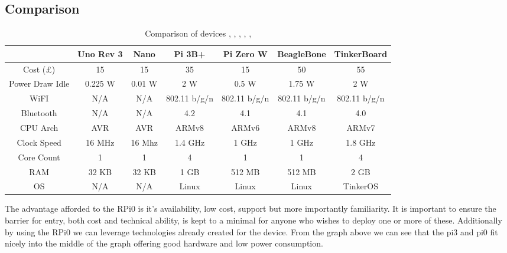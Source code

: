 \subsection{Comparison}
\begin{table}[H]
	\hspace{-2cm}
	\begin{tabular}{ccccccc}
		\hline 
		{} & Uno Rev 3 & Nano & Pi 3B+ & Pi Zero W & BeagleBone & TinkerBoard \\ 
		\hline 
		Cost (£) & 15 & 15 & 35 & 15 & 50 & 55 \\ 
		Power Draw Idle & 0.225 W & 0.01 W & 2 W & 0.5 W & 1.75 W & 2 W  \\ 
		WiFI & N/A & N/A & 802.11 b/g/n & 802.11 b/g/n & 802.11 b/g/n & 802.11 b/g/n \\ 
		Bluetooth & N/A & N/A & 4.2 & 4.1 & 4.1 & 4.0 \\ 
		CPU Arch & AVR & AVR & ARMv8 & ARMv6 & ARMv8 & ARMv7 \\ 
		Clock Speed & 16 MHz & 16 Mhz & 1.4 GHz & 1 GHz & 1 GHz & 1.8 GHz \\ 
		Core Count & 1 & 1 & 4 & 1 & 1 & 4 \\ 
		RAM & 32 KB & 32 KB & 1 GB & 512 MB & 512 MB & 2 GB \\ 
		OS & N/A & N/A & Linux & Linux & Linux & TinkerOS \\
		\hline 
	\end{tabular}
	\caption{ Comparison of devices \citep{ArduinoLLC2010}, \citep{ArduinoLLC2008a}, \citep{RaspberryPiFoundation2018}, \citep{RaspberryPiFoundation2017}, \citep{BeagleBoard2017}, \citep{Asus2017}}
	\label{fig:devicecompare}
\end{table}

The advantage afforded to the RPi0 is it’s availability, low cost, support but more importantly familiarity. It is important to ensure the barrier for entry, both cost and technical ability, is kept to a minimal for anyone who wishes to deploy one or more of these. Additionally by using the RPi0 we can leverage technologies already created for the device. 
From the graph above we can see that the pi3 and pi0 fit nicely into the middle of the graph offering good hardware and low power consumption. 